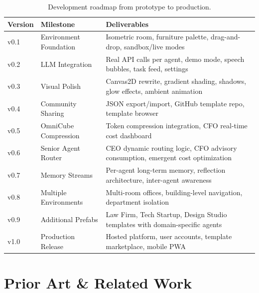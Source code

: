 \documentclass[11pt,letterpaper]{article}
\begin{document}
\begin{table}[H]
\centering
\small
\begin{tabularx}{\textwidth}{llX}
\toprule
\textbf{Version} & \textbf{Milestone} & \textbf{Deliverables} \\
\midrule
v0.1 & Environment Foundation   & Isometric room, furniture palette, drag-and-drop, sandbox/live modes \\
v0.2 & LLM Integration          & Real API calls per agent, demo mode, speech bubbles, task feed, settings \\
v0.3 & Visual Polish             & Canvas2D rewrite, gradient shading, shadows, glow effects, ambient animation \\
\midrule
v0.4 & Community Sharing         & JSON export/import, GitHub template repo, template browser \\
v0.5 & OmniCube Compression      & Token compression integration, CFO real-time cost dashboard \\
v0.6 & Senior Agent Router       & CEO dynamic routing logic, CFO advisory consumption, emergent cost optimization \\
v0.7 & Memory Streams            & Per-agent long-term memory, reflection architecture, inter-agent awareness \\
v0.8 & Multiple Environments     & Multi-room offices, building-level navigation, department isolation \\
v0.9 & Additional Prefabs        & Law Firm, Tech Startup, Design Studio templates with domain-specific agents \\
v1.0 & Production Release        & Hosted platform, user accounts, template marketplace, mobile PWA \\
\bottomrule
\end{tabularx}
\caption{Development roadmap from prototype to production.}
\end{table}


\section{Prior Art \& Related Work}
\end{document}
